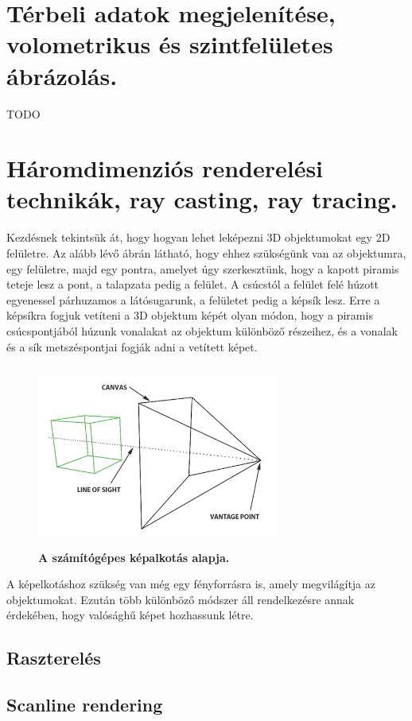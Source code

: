 \documentclass[12pt]{article}
\theoremstyle{plain}
\begin{document}
 \section{Térbeli adatok megjelenítése, volometrikus és szintfelületes ábrázolás.}
 TODO
 
 \section{Háromdimenziós renderelési technikák, ray casting, ray tracing.}
 Kezdésnek tekintsük át, hogy hogyan lehet leképezni 3D objektumokat egy 2D felületre. Az alább lévő ábrán látható, hogy ehhez szükségünk van az objektumra, egy felületre, majd egy pontra, amelyet úgy szerkesztünk, hogy a kapott piramis teteje lesz a pont, a talapzata pedig a felület. A csúcstól a felület felé húzott egyenessel párhuzamos a látósugarunk, a felületet pedig a képsík lesz. Erre a képsíkra fogjuk vetíteni a 3D objektum képét olyan módon, hogy a piramis csúcspontjából húzunk vonalakat az objektum különböző részeihez, és a vonalak és a sík metszéspontjai fogják adni a vetített képet. 
 \begin{figure}[H]
    \centering
    \includegraphics[width=8cm, height=6cm]{media/vantagepoint.png}
    \caption{\textbf{A számítógépes képalkotás alapja.}}
    \label{fig:GeneralDiagram}
 \end{figure}
 \newline
 
 A képelkotáshoz szükség van még egy fényforrásra is, amely megvilágítja az objektumokat. Ezután több különböző módszer áll rendelkezésre annak érdekében, hogy valósághű képet hozhassunk létre. 
 
 \subsection{Raszterelés}
 
 \subsection{Scanline rendering}
 
\end{document}
